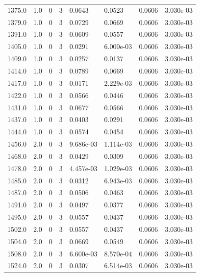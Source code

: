 \documentclass[preview]{standalone}
\begin{document}
{{{{{{{{\begin{tabular}{L{1.2cm}C{1.2cm} C{0.3cm}C{0.5cm} C{1.4cm}C{1.4cm} C{1.4cm}C{1.4cm}}
  1375.0  &   1.0  & 0     &  3 &  0.0643  & 0.0523  & 0.0606 &  3.030e-03   \\ 
  1379.0  &   1.0  & 0     &  3 &  0.0729  & 0.0669  & 0.0606 &  3.030e-03   \\ 
  1391.0  &   1.0  & 0     &  3 &  0.0609  & 0.0557  & 0.0606 &  3.030e-03   \\ 
  1405.0  &   1.0  & 0     &  3 &  0.0291  & 6.000e-03  & 0.0606 &  3.030e-03   \\ 
  1409.0  &   1.0  & 0     &  3 &  0.0257  & 0.0137  & 0.0606 &  3.030e-03   \\ 
  1414.0  &   1.0  & 0     &  3 &  0.0789  & 0.0669  & 0.0606 &  3.030e-03   \\ 
  1417.0  &   1.0  & 0     &  3 &  0.0171  & 2.229e-03  & 0.0606 &  3.030e-03   \\ 
  1422.0  &   1.0  & 0     &  3 &  0.0566  & 0.0446  & 0.0606 &  3.030e-03   \\ 
  1431.0  &   1.0  & 0     &  3 &  0.0677  & 0.0566  & 0.0606 &  3.030e-03   \\ 
  1437.0  &   1.0  & 0     &  3 &  0.0403  & 0.0291  & 0.0606 &  3.030e-03   \\ 
  1444.0  &   1.0  & 0     &  3 &  0.0574  & 0.0454  & 0.0606 &  3.030e-03   \\ 
  1456.0  &   2.0  & 0     &  3 &  9.686e-03  & 1.114e-03  & 0.0606 &  3.030e-03   \\ 
  1468.0  &   2.0  & 0     &  3 &  0.0429  & 0.0309  & 0.0606 &  3.030e-03   \\ 
  1478.0  &   2.0  & 0     &  3 &  4.457e-03  & 1.029e-03  & 0.0606 &  3.030e-03   \\ 
  1485.0  &   2.0  & 0     &  3 &  0.0312  & 6.943e-03  & 0.0606 &  3.030e-03   \\ 
  1487.0  &   2.0  & 0     &  3 &  0.0506  & 0.0463  & 0.0606 &  3.030e-03   \\ 
  1491.0  &   2.0  & 0     &  3 &  0.0497  & 0.0377  & 0.0606 &  3.030e-03   \\ 
  1495.0  &   2.0  & 0     &  3 &  0.0557  & 0.0437  & 0.0606 &  3.030e-03   \\ 
  1502.0  &   2.0  & 0     &  3 &  0.0557  & 0.0437  & 0.0606 &  3.030e-03   \\ 
  1504.0  &   2.0  & 0     &  3 &  0.0669  & 0.0549  & 0.0606 &  3.030e-03   \\ 
  1508.0  &   2.0  & 0     &  3 &  6.600e-03  & 8.570e-04  & 0.0606 &  3.030e-03   \\ 
  1524.0  &   2.0  & 0     &  3 &  0.0307  & 6.514e-03  & 0.0606 &  3.030e-03   \\ 

\end{tabular}}}}}}}}}
\end{document}
